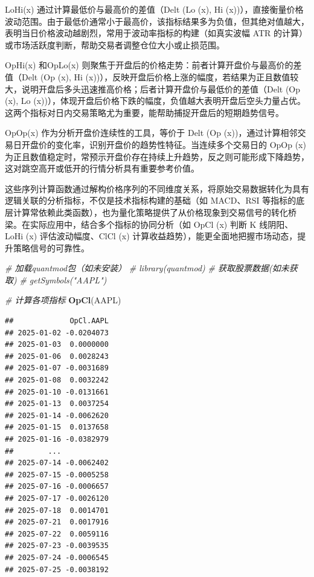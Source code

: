 \documentclass[]{ctexbook}
\newenvironment{Shaded}{\begin{snugshade}}{\end{snugshade}}
\newcommand{\CommentTok}[1]{\textcolor[rgb]{0.56,0.35,0.01}{\textit{#1}}}
\newcommand{\FunctionTok}[1]{\textcolor[rgb]{0.13,0.29,0.53}{\textbf{#1}}}
\newcommand{\NormalTok}[1]{#1}
\begin{document}
LoHi(x) 通过计算最低价与最高价的差值（Delt (Lo (x), Hi (x))），直接衡量价格波动范围。由于最低价通常小于最高价，该指标结果多为负值，但其绝对值越大，表明当日价格波动越剧烈，常用于波动率指标的构建（如真实波幅 ATR 的计算）或市场活跃度判断，帮助交易者调整仓位大小或止损范围。

OpHi(x) 和OpLo(x) 则聚焦于开盘后的价格走势：前者计算开盘价与最高价的差值（Delt (Op (x), Hi (x))），反映开盘后价格上涨的幅度，若结果为正且数值较大，说明开盘后多头迅速推高价格；后者计算开盘价与最低价的差值（Delt (Op (x), Lo (x))），体现开盘后价格下跌的幅度，负值越大表明开盘后空头力量占优。这两个指标对日内交易策略尤为重要，能帮助捕捉开盘后的短期趋势信号。

OpOp(x) 作为分析开盘价连续性的工具，等价于 Delt (Op (x))，通过计算相邻交易日开盘价的变化率，识别开盘价的趋势性特征。当连续多个交易日的 OpOp (x) 为正且数值稳定时，常预示开盘价存在持续上升趋势，反之则可能形成下降趋势，这对跳空高开或低开的行情分析具有重要参考价值。

这些序列计算函数通过解构价格序列的不同维度关系，将原始交易数据转化为具有逻辑关联的分析指标，不仅是技术指标构建的基础（如 MACD、RSI 等指标的底层计算常依赖此类函数），也为量化策略提供了从价格现象到交易信号的转化桥梁。在实际应用中，结合多个指标的协同分析（如 OpCl (x) 判断 K 线阴阳、LoHi (x) 评估波动幅度、ClCl (x) 计算收益趋势），能更全面地把握市场动态，提升策略信号的可靠性。

\begin{Shaded}
\begin{Highlighting}[]
\CommentTok{\# 加载quantmod包（如未安装）}
\CommentTok{\# library(quantmod)}
\CommentTok{\# 获取股票数据(如未获取)}
\CommentTok{\# getSymbols("AAPL")}

\CommentTok{\# 计算各项指标}
\FunctionTok{OpCl}\NormalTok{(AAPL)}
\end{Highlighting}
\end{Shaded}

\begin{verbatim}
##             OpCl.AAPL
## 2025-01-02 -0.0204073
## 2025-01-03  0.0000000
## 2025-01-06  0.0028243
## 2025-01-07 -0.0031689
## 2025-01-08  0.0032242
## 2025-01-10 -0.0131661
## 2025-01-13  0.0037254
## 2025-01-14 -0.0062620
## 2025-01-15  0.0137658
## 2025-01-16 -0.0382979
##        ...           
## 2025-07-14 -0.0062402
## 2025-07-15 -0.0005258
## 2025-07-16 -0.0006657
## 2025-07-17 -0.0026120
## 2025-07-18  0.0014701
## 2025-07-21  0.0017916
## 2025-07-22  0.0059116
## 2025-07-23 -0.0039535
## 2025-07-24 -0.0006545
## 2025-07-25 -0.0038192
\end{verbatim}
\end{document}
